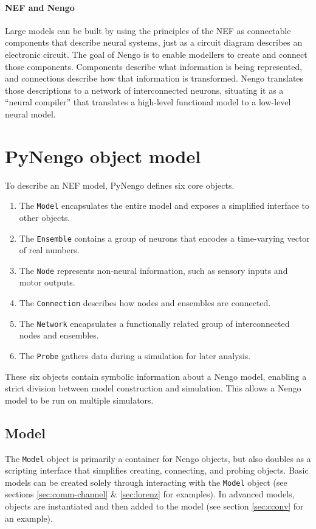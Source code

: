 \documentclass{frontiersSCNS}
\begin{document}
\paragraph{NEF and Nengo}
Large models can be built
by using the principles of the NEF
as connectable components
that describe neural systems,
just as a circuit diagram
describes an electronic circuit.
The goal of Nengo is to enable
modellers to create and connect those components.
Components describe
what information is being represented,
and connections describe
how that information is transformed.
Nengo translates those descriptions
to a network of interconnected neurons,
situating it as a ``neural compiler''
that translates
a high-level functional model
to a low-level neural model.

\section{PyNengo object model}

To describe an NEF model,
PyNengo defines six core objects.
\begin{enumerate}
  \item The \texttt{Model} encapsulates the entire model and
    exposes a simplified interface to other objects.
  \item The \texttt{Ensemble} contains a group of neurons
    that encodes a time-varying vector of real numbers.
  \item The \texttt{Node} represents non-neural information,
    such as sensory inputs and motor outputs.
  \item The \texttt{Connection} describes how
    nodes and ensembles are connected.
  \item The \texttt{Network} encapsulates a functionally related
    group of interconnected nodes and ensembles.
  \item The \texttt{Probe} gathers data during a simulation
    for later analysis.
\end{enumerate}
These six objects contain symbolic information
about a Nengo model,
enabling a strict division between
model construction and simulation.
This allows a Nengo model
to be run on multiple simulators.

\subsection{Model}

The \texttt{Model} object is primarily a container
for Nengo objects,
but also doubles as a scripting interface
that simplifies creating, connecting,
and probing objects.
Basic models
can be created solely through interacting
with the \texttt{Model} object
(see sections \ref{sec:comm-channel} \& \ref{sec:lorenz}
for examples).
In advanced models,
objects are instantiated
and then added to the model
(see section \ref{sec:cconv} for an example).
\end{document}
